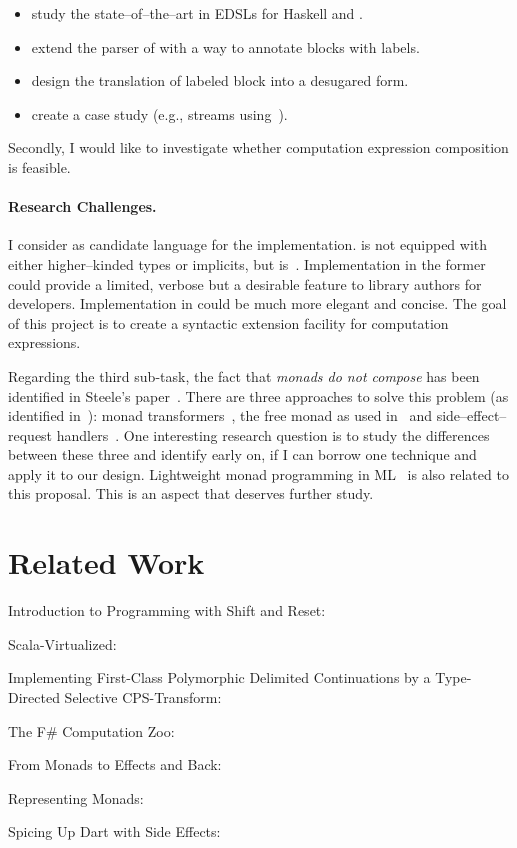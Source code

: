 \documentclass{sigplanconf}
\begin{document}
\begin{itemize}{}{}
\item study the state--of--the--art in EDSLs for Haskell and \fs{}.
\item extend the parser of \java{} with a way to annotate blocks with labels.
\item design the translation of labeled block into a desugared form.
\item create a case study (e.g., streams
  using~\cite{biboudis_streams_2015}).
\end{itemize}

Secondly, I would like to investigate whether computation expression
composition is feasible.

\paragraph{Research Challenges.}
I consider \java{} as candidate language for the
implementation. \java{} is not equipped with either higher--kinded
types or implicits, but \scala{}
is~\cite{oliveira_type_2010,moors_generics_2008}. Implementation in
the former could provide a limited, verbose but a desirable feature to
library authors for \java{} developers. Implementation in \scala{}
could be much more elegant and concise. The goal of this project is to
create a syntactic extension facility for computation
expressions. %

Regarding the third sub-task, the fact that \emph{monads do not
  compose} has been identified in Steele's
paper~\cite{steele_building_1994}. There are three approaches to solve
this problem (as identified in~\cite{kiselyov_freer_2015}): monad
transformers~\cite{liang_monad_1995}, the free monad as used
in~\cite{swierstra_data_2008} and side--effect--request
handlers~\cite{cartwright_extensible_1994}. One interesting research
question is to study the differences between these three and identify
early on, if I can borrow one technique and apply it to our
design. Lightweight monad programming in
ML~\cite{swamy_lightweight_2011} is also related to this proposal.
This is an aspect that deserves further study.

\section{Related Work}
Introduction to Programming with Shift and Reset:

Scala-Virtualized:

Implementing First-Class Polymorphic Delimited Continuations by a Type-Directed Selective CPS-Transform:


The F# Computation Zoo:

From Monads to Effects and Back:

Representing Monads:

Spicing Up Dart with Side Effects:


\renewcommand{\baselinestretch}{0.7}
{\tiny}
\end{document}
